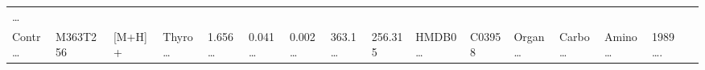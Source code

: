 \documentclass[
]{article}
\begin{document}
\begin{longtable}[]{@{}llllllllllllllll@{}}
\begin{minipage}[t]{0.02\columnwidth}
\ldots{}\strut
\end{minipage}\tabularnewline
\begin{minipage}[t]{0.04\columnwidth}\raggedright
Contr\ldots{}\strut
\end{minipage} & \begin{minipage}[t]{0.04\columnwidth}\raggedright
M363T256\strut
\end{minipage} & \begin{minipage}[t]{0.04\columnwidth}\raggedright
{[}M+H{]}+\strut
\end{minipage} & \begin{minipage}[t]{0.04\columnwidth}\raggedright
Thyro\ldots{}\strut
\end{minipage} & \begin{minipage}[t]{0.04\columnwidth}\raggedright
1.656\ldots{}\strut
\end{minipage} & \begin{minipage}[t]{0.04\columnwidth}\raggedright
0.041\ldots{}\strut
\end{minipage} & \begin{minipage}[t]{0.04\columnwidth}\raggedright
0.002\ldots{}\strut
\end{minipage} & \begin{minipage}[t]{0.04\columnwidth}\raggedright
363.1\ldots{}\strut
\end{minipage} & \begin{minipage}[t]{0.04\columnwidth}\raggedright
256.315\strut
\end{minipage} & \begin{minipage}[t]{0.04\columnwidth}\raggedright
HMDB0\ldots{}\strut
\end{minipage} & \begin{minipage}[t]{0.03\columnwidth}\raggedright
C03958\strut
\end{minipage} & \begin{minipage}[t]{0.04\columnwidth}\raggedright
Organ\ldots{}\strut
\end{minipage} & \begin{minipage}[t]{0.04\columnwidth}\raggedright
Carbo\ldots{}\strut
\end{minipage} & \begin{minipage}[t]{0.04\columnwidth}\raggedright
Amino\ldots{}\strut
\end{minipage} & \begin{minipage}[t]{0.04\columnwidth}\raggedright
1989\ldots.\strut
\end{minipage} & \begin{minipage}[t]{0.02\columnwidth}\raggedright

\end{minipage}
\end{longtable}
\end{document}
